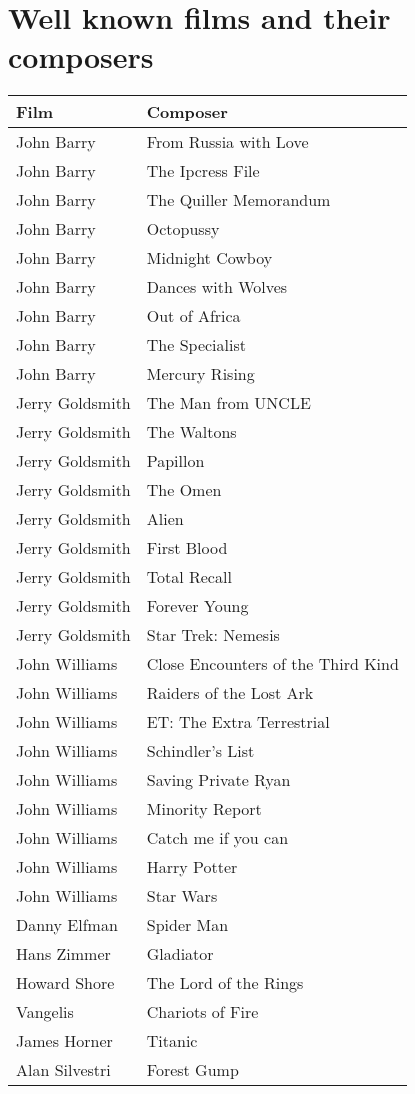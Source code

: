 \section{Well known films and their composers}
 
\begin{table}[H]
\begin{tabular}{|p{5.0cm}|p{8.0cm}|}
\hline
Film & Composer \\\hline
John Barry &  From Russia with Love   \\\hline
John Barry &  The Ipcress File  \\\hline
John Barry &  The Quiller Memorandum   \\\hline
John Barry &  Octopussy   \\\hline
John Barry &  Midnight Cowboy   \\\hline
John Barry &  Dances with Wolves   \\\hline
John Barry &  Out of Africa   \\\hline
John Barry &  The Specialist   \\\hline
John Barry &  Mercury Rising   \\\hline
Jerry Goldsmith &  The Man from UNCLE   \\\hline
Jerry Goldsmith &  The Waltons   \\\hline
Jerry Goldsmith &  Papillon   \\\hline
Jerry Goldsmith &  The Omen   \\\hline
Jerry Goldsmith &  Alien   \\\hline
Jerry Goldsmith &  First Blood   \\\hline
Jerry Goldsmith &  Total Recall   \\\hline
Jerry Goldsmith &  Forever Young   \\\hline
Jerry Goldsmith &  Star Trek: Nemesis   \\\hline
John Williams & Close Encounters of the Third Kind    \\\hline
John Williams & Raiders of the Lost Ark    \\\hline
John Williams & ET: The Extra Terrestrial    \\\hline
John Williams & Schindler's List    \\\hline
John Williams & Saving Private Ryan    \\\hline
John Williams & Minority Report    \\\hline
John Williams & Catch me if you can    \\\hline
John Williams & Harry Potter    \\\hline
John Williams & Star Wars    \\\hline
Danny Elfman & Spider Man    \\\hline
Hans Zimmer &  Gladiator   \\\hline
Howard Shore &  The Lord of the Rings   \\\hline
Vangelis &  Chariots of Fire   \\\hline
James Horner & Titanic    \\\hline
Alan Silvestri & Forest Gump    \\\hline


\end{tabular}
\end{table}
